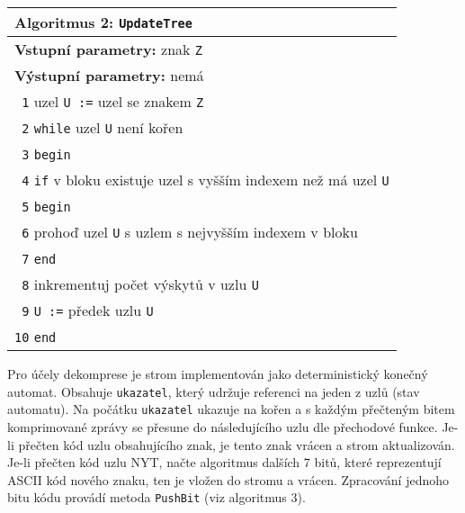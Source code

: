 \begin{table}[!h]
\centering
\begin{tabular}{|l|}
\hline
\textbf{Algoritmus 2:} \texttt{UpdateTree}\\
\hline
\textbf{Vstupní parametry:} znak \texttt{Z}\\
\textbf{Výstupní parametry:} nemá\\
\hline
\texttt{ 1} uzel \texttt{U :=} uzel se znakem \texttt{Z}\\
\texttt{ 2} \texttt{while} uzel \texttt{U} není kořen\\
\texttt{ 3} \texttt{begin}\\
\texttt{ 4} \hspace*{5mm}\texttt{if} v bloku existuje uzel s vyšším indexem než má uzel \texttt{U}\\
\texttt{ 5} \hspace*{5mm}\texttt{begin}\\
\texttt{ 6} \hspace*{10mm}prohoď uzel \texttt{U} s uzlem s nejvyšším indexem v bloku\\
\texttt{ 7} \hspace*{5mm}\texttt{end}\\
\texttt{ 8} \hspace*{5mm}inkrementuj počet výskytů v uzlu \texttt{U}\\
\texttt{ 9} \hspace*{5mm}\texttt{U :=} předek uzlu \texttt{U}\\
\texttt{10} \texttt{end}\\
\hline
\end{tabular}
\end{table}

Pro účely dekomprese je strom implementován jako deterministický konečný automat. Obsahuje \texttt{ukazatel}, který udržuje referenci na jeden z uzlů (stav automatu). Na počátku \texttt{ukazatel} ukazuje na kořen a s každým přečteným bitem komprimované zprávy se přesune do následujícího uzlu dle přechodové funkce. Je-li přečten kód uzlu obsahujícího znak, je tento znak vrácen a strom aktualizován. Je-li přečten kód uzlu NYT, načte algoritmus dalších 7 bitů, které reprezentují ASCII kód nového znaku, ten je vložen do stromu a vrácen. Zpracování jednoho bitu kódu provádí metoda \texttt{PushBit} (viz algoritmus 3).

